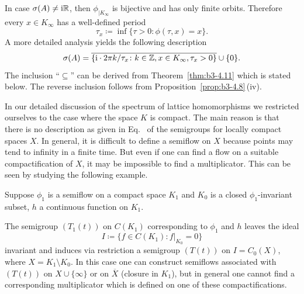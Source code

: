 \begin{remark}\label{rem:b3-4.10}
	In case $\sigma(A) \neq \mathrm{i}\mathbb{R}$, then $\phi_{|K_{\infty}}$ is bijective and has only finite orbits.
	Therefore every $x \in K_{\infty}$ has a well-defined period 
    \[
    \tau_{x} \coloneq \inf\{\tau > 0 \colon \phi(\tau,x) = x\} .
    \]
	A more detailed analysis yields the following description 
	\begin{equation}\label{eq:b3-4.16}
		\sigma(A) = \overline{\{\mathrm{i} \cdot 2\pi k/\tau_{x} \colon k \in \mathbb{Z}, x \in K_{\infty}, \tau_{x} > 0\}} \cup \{0\}.
	\end{equation}
	The inclusion \enquote{$\subseteq$} can be derived from Theorem~\ref{thm:b3-4.11} which is stated below.
	The reverse inclusion follows from Proposition~\ref{prop:b3-4.8}\,(iv).
\end{remark}
	
	In our detailed discussion of the spectrum of lattice homomorphisms we restricted ourselves to the case where the space $K$ is compact.
	The main reason is that there is no description as given in Eq.~ of the semigroups for locally compact spaces $X$.
	In general, it is difficult to define a semiflow on $X$ because points may tend to infinity in a finite time.
	But even if one can find a flow on a suitable compactification of\/ $X$, it may be impossible to find a multiplicator.
	This can be seen by studying the following example.
	
	Suppose $\phi_{1}$ is a semiflow on a compact space $K_{1}$ and $K_{0}$ is a closed $\phi_{1}$-invariant subset, $h$ a continuous function on $K_{1}$.

    The semigroup $(T_{1}(t))$ on $C(K_{1})$ corresponding to $\phi_{1}$ and $h$ leaves the ideal 
    \[
    I \coloneq \{f \in C(K_{1}) \colon f|_{K_{0}} = 0\}
    \] 
    invariant and induces via restriction a semigroup $(T(t))$ on $I = C_{0}(X)$, where $X = K_{1} \setminus K_{0}$.
    In this case one can construct semiflows associated with $(T(t))$ on $X\cup\{\infty\}$ or on $\overline{X}$ (closure in $K_{1}$), but in general one cannot find a corresponding multiplicator which is defined on one of these compactifications.

